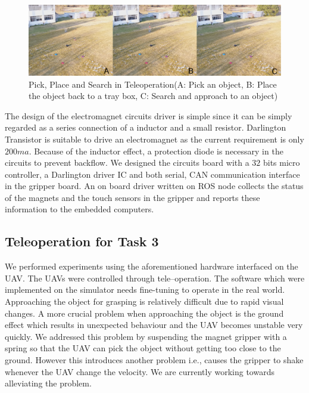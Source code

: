 \documentclass{standalone}
\begin{document}
 \begin{figure}%
    \begin{center}
    \includegraphics[keepaspectratio=true, width=1\linewidth, height=0.3\textheight]
    {sections//task3//images//teleop.png}
      \end{center}
    \caption{Pick, Place and Search in Teleoperation(A: Pick an object, B: Place the object back to a tray box, C: Search and approach to an object)}
    \label{task3tele}
    \end{figure}

    
The design of the electromagnet circuits driver is simple since it can
be simply regarded as a series connection of a inductor and a small
resistor. Darlington Transistor is suitable to drive an
electromagnet as the current requirement is only $200 ma$. Because of
the inductor effect, a protection diode is necessary in the
circuits to prevent backflow. We designed the circuits board with a
$32$ bits micro controller, a Darlington driver IC and both serial, CAN communication
interface in the gripper board. An on board driver written on ROS node
collects the status of the magnets and the touch sensors in the
gripper and reports these information to the embedded computers.



\subsection{Teleoperation for Task 3}

We performed experiments using the aforementioned hardware interfaced
on the UAV. The UAVs were controlled through tele--operation. The
software which were implemented on the simulator needs
fine-tuning to operate in the real world. Approaching the object for
grasping is relatively difficult due to rapid visual changes. A more
crucial problem when approaching the object is the ground effect which 
results in unexpected behaviour and the UAV becomes unstable very
quickly. We addressed this problem by suspending the magnet gripper with
a spring so that the UAV can pick the object without getting too close
to the ground. However this introduces another problem i.e., causes
the gripper to shake whenever the UAV change the velocity. We are
currently working towards alleviating the problem.
\end{document}
